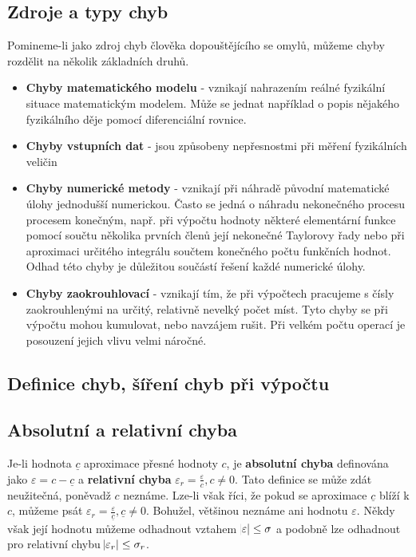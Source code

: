     \subsection{Zdroje a typy chyb}
      Pomineme-li jako zdroj chyb člověka dopouštějícího se omylů, můžeme chyby rozdělit na několik
      základních druhů.
      \begin{itemize}
        \item \textbf{Chyby matematického modelu} - vznikají nahrazením reálné fyzikální situace
              matematickým modelem. Může se jednat například o popis nějakého fyzikálního děje 
              pomocí diferenciální rovnice.
        \item \textbf{Chyby vstupních dat} - jsou způsobeny nepřesnostmi při měření fyzikálních
              veličin
        \item \textbf{Chyby numerické metody} - vznikají při náhradě původní matematické úlohy
              jednodušší numerickou. Často se jedná o náhradu nekonečného procesu procesem konečným,
              např. při výpočtu hodnoty některé elementární funkce pomocí součtu několika prvních
              členů její nekonečné Taylorovy řady nebo při aproximaci určitého integrálu souč\-tem
              konečného počtu funkčních hodnot. Odhad této chyby je důležitou součástí řešení každé
              numerické úlohy.
        \item \textbf{Chyby zaokrouhlovací} - vznikají tím, že při výpočtech pracujeme s čísly
              zaokrouhlenými na určitý, relativně nevelký počet míst. Tyto chyby se při výpočtu 
              mohou kumulovat, nebo navzájem rušit. Při vel\-kém počtu operací je posouzení jejich 
              vlivu velmi náročné.
      \end{itemize}
      
    \subsection{Definice chyb, šíření chyb při výpočtu}
      \subsection{Absolutní a relativní chyba}
        Je-li hodnota $\underline{c}$ aproximace přesné hodnoty $c$, je \textbf{absolutní chyba}
        definována jako $\varepsilon=c-\underline{c}$ a \textbf{relativní chyba}
        $\varepsilon_r=\frac{\varepsilon}{c},c\neq0$. Tato definice se může zdát neužitečná, 
        poněvadž $c$ neznáme. Lze-li však říci, že pokud se aproximace $\underline{c}$ blíží k $c$, 
        můžeme psát $\varepsilon_r=\frac{\varepsilon}{\underline{c}},\underline{c}\neq0$. Bohužel, 
        většinou neznáme ani hodnotu $\varepsilon$. Někdy však její hodnotu můžeme odhadnout vztahem
        \(\abs{\varepsilon}\leq\sigma\) a podobně lze odhadnout pro relativní chybu 
        \(\abs{\varepsilon_r}\leq\sigma_r\).
